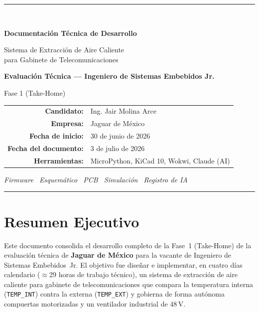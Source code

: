\documentclass[11pt,letterpaper]{article}
\begin{document}
\begin{titlepage}
  \centering
  {\color{JagAccent}\rule{\textwidth}{2pt}}\\[2.5cm]
  {\Huge\bfseries\color{JagDark} Documentación Técnica de Desarrollo\par}
  \vspace{0.8cm}
  {\LARGE\color{JagMid} Sistema de Extracción de Aire Caliente\\[0.2cm] para Gabinete de Telecomunicaciones\par}
  \vspace{1.6cm}
  {\large\bfseries Evaluación Técnica --- Ingeniero de Sistemas Embebidos Jr.\par}
  \vspace{0.3cm}
  {\large Fase 1 (Take-Home)\par}
  \vspace{2.2cm}
  \begin{tabular}{r l}
    \textbf{\color{JagDark}Candidato:} & Ing. Jair Molina Arce \\[4pt]
    \textbf{\color{JagDark}Empresa:} & Jaguar de México \\[4pt]
    \textbf{\color{JagDark}Fecha de inicio:} & 30 de junio de 2026 \\[4pt]
    \textbf{\color{JagDark}Fecha del documento:} & 3 de julio de 2026 \\[4pt]
    \textbf{\color{JagDark}Herramientas:} & MicroPython, KiCad 10, Wokwi, Claude (AI) \\
  \end{tabular}
  \vfill
  {\color{JagGray}\itshape Firmware \textbullet\ Esquemático \textbullet\ PCB \textbullet\ Simulación \textbullet\ Registro de IA\par}
  \vspace{0.8cm}
  {\color{JagAccent}\rule{\textwidth}{2pt}}
\end{titlepage}

\section*{\color{JagDark}Resumen Ejecutivo}

Este documento consolida el desarrollo completo de la Fase~1 (Take-Home) de la evaluación
técnica de \textbf{Jaguar de México} para la vacante de Ingeniero de Sistemas Embebidos~Jr.
El objetivo fue diseñar e implementar, en cuatro días calendario ($\approx$29 horas de
trabajo técnico), un sistema de extracción de aire caliente para gabinete de
telecomunicaciones que compara la temperatura interna (\texttt{TEMP\_INT}) contra la
externa (\texttt{TEMP\_EXT}) y gobierna de forma autónoma compuertas motorizadas y un
ventilador industrial de 48\,V.
\end{document}
